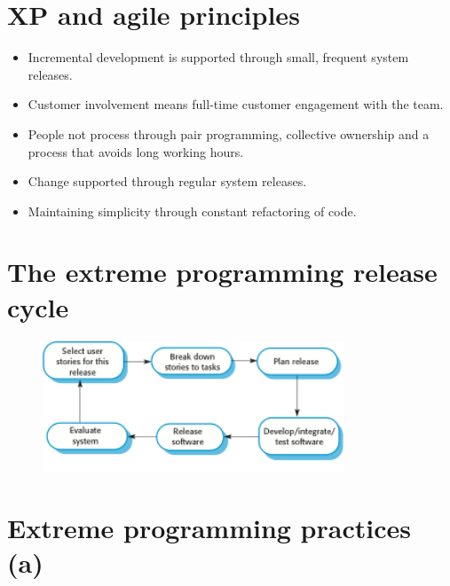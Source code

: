 \section{ XP and agile principles}
\begin{itemize}
\item Incremental development is supported through small, frequent system releases.

\item Customer involvement means full-time customer engagement with the team.

\item People not process through pair programming, collective ownership and a process that avoids long working hours.

\item Change supported through regular system releases.

\item Maintaining simplicity through constant refactoring of code.
\end{itemize}
\section{ The extreme programming release cycle}
\begin{figure}[h!]
    \centering
    \includegraphics[width = 0.8\textwidth]{./figures/L2_2.png}
    \caption{}
    \label{fig:L2_2}
\end{figure}
\newpage
\section{ Extreme programming practices (a)}

